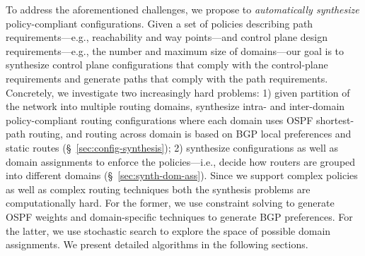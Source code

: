  To address the aforementioned
challenges, we propose to \emph{automatically synthesize}
policy-compliant configurations.  Given a set of policies describing
path requirements---e.g., reachability and way points---and control
plane design requirements---e.g., the number and maximum size of
domains---our goal is to synthesize control plane configurations that
comply with the control-plane requirements and generate paths that
comply with the path requirements. 
Concretely, we investigate two increasingly
hard problems: 1) given partition of the network into multiple routing
domains, synthesize intra- and inter-domain policy-compliant routing  configurations
where each domain uses OSPF shortest-path routing, and
routing across domain is based on BGP local preferences and static
routes (\S~\ref{sec:config-synthesis}); 2) synthesize configurations
as well as domain assignments to enforce the policies---i.e., decide how routers are grouped
into different domains
(\S~\ref{sec:synth-dom-ass}).  Since we support complex
policies as well as complex
routing techniques both the synthesis
problems are computationally hard.  For the former, we use
constraint solving to generate OSPF weights and domain-specific
techniques to generate BGP preferences. For the latter, we use stochastic
search to explore the space of possible domain assignments.
We present detailed algorithms in the following sections. 
